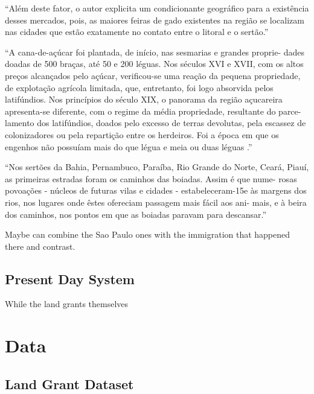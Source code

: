 \documentclass{article}
\begin{document}
``Além deste fator, o autor explicita um condicionante geográfico para a existência desses mercados, pois, as maiores feiras de gado existentes na região se localizam nas cidades que estão exatamente no contato entre o litoral e o sertão.'' \parencite{Galdino_Dantas2008-pw}

``A  cana-de-açúcar foi  plantada,  de  início,  nas sesmarias  e  grandes  proprie- dades  doadas de  500  braças,  até  50  e  200  léguas.  Nos  séculos XVI  e  XVII,  com  os  altos  preços  alcançados  pelo  açúcar,  verificou-se  uma  reação  da  pequena  propriedade,  de  explotação agrícola  limitada,  que,  entretanto,  foi  logo  absorvida  pelos latifúndios. Nos  princípios  do  século  XIX, o panorama da região  açucareira  apresenta-se diferente,  com o  regime da média propriedade, resultante  do parce- lamento  dos  latifúndios,  doados  pelo  excesso  de  terras  devolutas,  pela  escassez  de  colonizadores  ou  pela  repartição  entre  os  herdeiros.  Foi  a  época  em  que  os  engenhos  não  possuíam  mais  do  que  légua  e  meia  ou  duas  léguas .''
\parencite[p.~118]{De_Geografia1970-nk}


``Nos  sertões  da  Bahia,  Pernambuco,  Paraíba,  Rio  Grande  do  Norte,  Ceará,  Piauí, as primeiras estradas foram os  caminhos das boiadas.  Assim  é  que nume- rosas  povoações  - núcleos  de  futuras  vilas  e  cidades  - estabeleceram-15e  às  margens dos rios,  nos lugares onde  êstes ofereciam passagem mais fácil  aos ani- mais,  e  à  beira  dos  caminhos,  nos  pontos  em  que  as  boiadas  paravam  para  descansar.''
\parencite[p.~164]{De_Geografia1970-nk}

\parencite{Panini1990-rj}

Maybe can combine the Sao Paulo ones with the immigration that happened there and contrast.

\subsection{Present Day System}

While the land grants themselves 

\section{Data}

\subsection{Land Grant Dataset}
\end{document}
